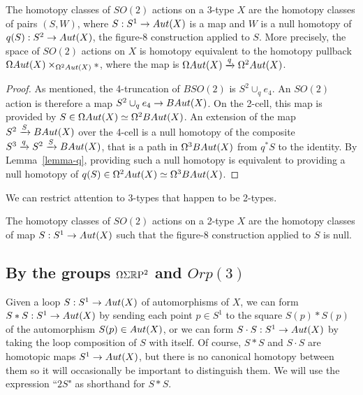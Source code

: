 \documentclass{amsart}
\begin{document}
\begin{prop}[Actions by $SO(2)$] 
\label{prop-so2action}
The homotopy classes of $SO(2)$ actions on a 3-type $X$ are the homotopy classes of pairs $(S,W)$, where $S: S^1 \rightarrow Aut(X)$ is a map and $W$ is a null homotopy of $q(S): S^2 \rightarrow Aut(X)$, the figure-8 construction applied to $S$.  More precisely, the space of $SO(2)$ actions on $X$ is homotopy equivalent to the homotopy pullback $\Omega Aut(X) \times_{\Omega^2 Aut(X)} \ast$, where the map is $\Omega Aut(X) \xrightarrow{q} \Omega^2 Aut(X)$.
\end{prop}
\begin{proof}
As mentioned, the 4-truncation of $BSO(2)$ is $S^2 \cup_q e_4$.  An $SO(2)$ action is therefore a map $S^2 \cup_q e_4 \rightarrow BAut(X)$.  On the 2-cell, this map is provided by $S \in \Omega Aut(X) \simeq \Omega^2 BAut(X)$.  An extension of the map $S^2 \xrightarrow{S} BAut(X)$ over the 4-cell is a null homotopy of the composite $S^3 \xrightarrow{q} S^2 \xrightarrow{S} BAut(X)$, that is a path in $\Omega^3 BAut(X)$ from $q^\ast S$ to the identity.  By Lemma~\ref{lemma-q}, providing such a null homotopy is equivalent to providing a null homotopy of $q(S) \in \Omega^2Aut(X) \simeq \Omega^3 BAut(X)$.
\end{proof}

We can restrict attention to 3-types that happen to be 2-types.
\begin{corollary}
The homotopy classes of $SO(2)$ actions on a 2-type $X$ are the homotopy classes of map $S: S^1 \rightarrow Aut(X)$ such that the figure-8 construction applied to $S$ is null.
\end{corollary}

\subsection{By the groups $\Omega \Sigma \mathbb R \mathrm{P}^2$ and $Orp(3)$}

Given a loop $S: S^1 \rightarrow Aut(X)$ of automorphisms of $X$, we can form $S \ast S : S^1 \rightarrow Aut(X)$ by sending each point $p \in S^1$ to the square $S(p) \ast S(p)$ of the automorphism $S(p) \in Aut(X)$, or we can form $S \cdot S : S^1 \rightarrow Aut(X)$ by taking the loop composition of $S$ with itself.  Of course, $S \ast S$ and $S \cdot S$ are homotopic maps $S^1 \rightarrow Aut(X)$, but there is no canonical homotopy between them so it will occasionally be important to distinguish them.  We will use the expression ``$2S$" as shorthand for $S \ast S$.
\end{document}
